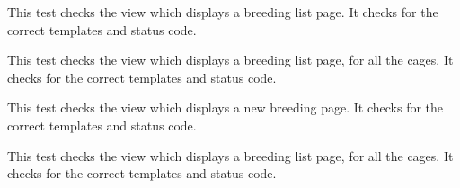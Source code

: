 \documentclass[letterpaper,10pt,english]{sphinxmanual}
\begin{document}
\begin{fulllineitems}
\begin{fulllineitems}
\end{fulllineitems}



\begin{fulllineitems}
\label{api:animal.tests.BreedingViewTests.test_breeding_list}
This test checks the view which displays a breeding list page.  It checks for the correct templates and status code.

\end{fulllineitems}



\begin{fulllineitems}
\label{api:animal.tests.BreedingViewTests.test_breeding_list_all}
This test checks the view which displays a breeding list page, for all the cages.  It checks for the correct templates and status code.

\end{fulllineitems}



\begin{fulllineitems}
\label{api:animal.tests.BreedingViewTests.test_breeding_new}
This test checks the view which displays a new breeding page.  It checks for the correct templates and status code.

\end{fulllineitems}



\begin{fulllineitems}
\label{api:animal.tests.BreedingViewTests.test_timed_mating_list}
This test checks the view which displays a breeding list page, for all the cages.  It checks for the correct templates and status code.

\end{fulllineitems}


\end{fulllineitems}


\end{document}
